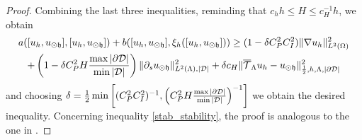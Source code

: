 \documentclass[r]{siamart171218}
\begin{document}
\begin{proof}
{%
Combining the last three inequalities, reminding that $c_h h\leq H \leq c_H^{-1}h$, 
we obtain
\begin{multline*}
a([u_h, u_{\odot \mathfrak{h}}],[u_h, u_{\odot \mathfrak{h}}] ) + b([u_h, u_{\odot \mathfrak{h}}], \xi_h([u_h, u_{\odot \mathfrak{h}}]))
\geq (1-\delta C_P^2 C_I^2) \|\nabla u_h\|^2_{L^2(\Omega)} 
\\
+ \left(1- \delta C_P^2 H \frac{\max |\partial\mathcal{D}|}{\min |\mathcal{D}|}\right) \|\partial_s u_{\odot \mathfrak{h}}\|^2_{L^2(\Lambda), |\mathcal{D}|}
+\delta c_H  \|{\overline{\mathcal{T}}_\Lambda} u_h-u_{\odot \mathfrak{h}}\|^2_{\frac 12,h,\Lambda, |\partial\mathcal{D}|}
\end{multline*}
and choosing $\delta=\frac{1}{2}\min\left[(C_P^2 C_I^2)^{-1}, \left(C_P^2 H \frac{\max |\partial\mathcal{D}|}{\min |\mathcal{D}|}\right)^{-1}\right]$ we obtain the desired inequality.
Concerning inequality \eqref{stab_stability}, the proof is analogous to the one in \cite{burman2014}.}
\end{proof}



\end{document}
